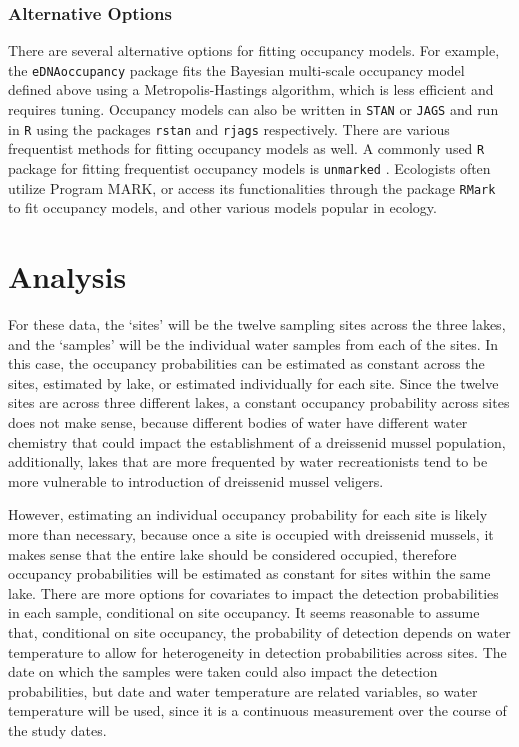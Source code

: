 \documentclass[12pt]{article}\usepackage[]{graphicx}\usepackage[]{color}
\begin{document}
\subsubsection{Alternative Options}

There are several alternative options for fitting occupancy models. For example, the \texttt{eDNAoccupancy} \cite{Dorazio_Erickson} package fits the Bayesian multi-scale occupancy model defined above using a Metropolis-Hastings algorithm, which is less efficient and requires tuning. Occupancy models can also be written in \texttt{STAN} or \texttt{JAGS} and run in \texttt{R} using the packages \texttt{rstan} \cite{rstan} and \texttt{rjags} \cite{rjags} respectively. There are various frequentist methods for fitting occupancy models as well. A commonly used \texttt{R} package for fitting frequentist occupancy models is \texttt{unmarked} \cite{unmarked}. Ecologists often utilize Program MARK, or access its functionalities through the  package \texttt{RMark} \cite{RMark} to fit occupancy models, and other various models popular in ecology.

\section{Analysis}

For these data, the `sites' will be the twelve sampling sites across the three lakes, and the `samples' will be the individual water samples from each of the sites. In this case, the occupancy probabilities can be estimated as constant across the sites, estimated by lake, or estimated individually for each site. Since the twelve sites are across three different lakes, a constant occupancy probability across sites does not make sense, because different bodies of water have different water chemistry that could impact the establishment of a dreissenid mussel population, additionally, lakes that are more frequented by water recreationists tend to be more vulnerable to introduction of dreissenid mussel veligers.

However, estimating an individual occupancy probability for each site is likely more than necessary, because once a site is occupied with dreissenid mussels, it makes sense that the entire lake should be considered occupied, therefore occupancy probabilities will be estimated as constant for sites within the same lake. There are more options for covariates to impact the detection probabilities in each sample, conditional on site occupancy. It seems reasonable to assume that, conditional on site occupancy, the probability of detection depends on water temperature to allow for heterogeneity in detection probabilities across sites. The date on which the samples were taken could also impact the detection probabilities, but date and water temperature are related variables, so water temperature will be used, since it is a continuous measurement over the course of the study dates. 
\end{document}

